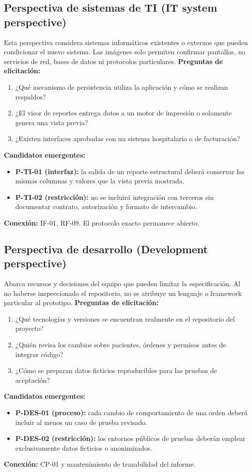 \subsection{Perspectiva de sistemas de TI (IT system perspective)}
Esta perspectiva considera sistemas informáticos existentes o externos que pueden condicionar el nuevo sistema. Las imágenes solo permiten confirmar pantallas, no servicios de red, bases de datos ni protocolos particulares.
\textbf{Preguntas de elicitación:}
\begin{enumerate}[label=\alph*)]
\item ¿Qué mecanismo de persistencia utiliza la aplicación y cómo se realizan respaldos?
\item ¿El visor de reportes entrega datos a un motor de impresión o solamente genera una vista previa?
\item ¿Existen interfaces aprobadas con un sistema hospitalario o de facturación?
\end{enumerate}
\textbf{Candidatos emergentes:}
\begin{itemize}
\item \textbf{P-TI-01 (interfaz):} la salida de un reporte estructural deberá conservar las mismas columnas y valores que la vista previa mostrada.
\item \textbf{P-TI-02 (restricción):} no se incluirá integración con terceros sin documentar contrato, autorización y formato de intercambio.
\end{itemize}
\textbf{Conexión:} IF-01, RF-09. El protocolo exacto permanece abierto.

\subsection{Perspectiva de desarrollo (Development perspective)}
Abarca recursos y decisiones del equipo que pueden limitar la especificación. Al no haberse inspeccionado el repositorio, no se atribuye un lenguaje o framework particular al prototipo.
\textbf{Preguntas de elicitación:}
\begin{enumerate}[label=\alph*)]
\item ¿Qué tecnologías y versiones se encuentran realmente en el repositorio del proyecto?
\item ¿Quién revisa los cambios sobre pacientes, órdenes y permisos antes de integrar código?
\item ¿Cómo se preparan datos ficticios reproducibles para las pruebas de aceptación?
\end{enumerate}
\textbf{Candidatos emergentes:}
\begin{itemize}
\item \textbf{P-DES-01 (proceso):} cada cambio de comportamiento de una orden deberá incluir al menos un caso de prueba revisado.
\item \textbf{P-DES-02 (restricción):} los entornos públicos de pruebas deberán emplear exclusivamente datos ficticios o anonimizados.
\end{itemize}
\textbf{Conexión:} CP-01 y mantenimiento de trazabilidad del informe.

